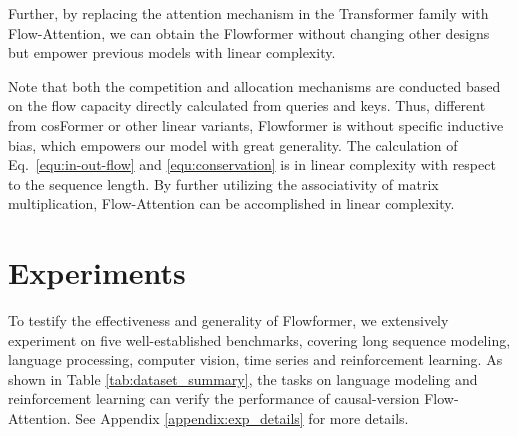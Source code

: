 \documentclass[nohyperref]{article}
\theoremstyle{plain}
\theoremstyle{definition}
\theoremstyle{remark}
\begin{document}
Further, by replacing the attention mechanism in the Transformer family \cite{NIPS2017_3f5ee243} with Flow-Attention, we can obtain the Flowformer without changing other designs but empower previous models with linear complexity.

Note that both the competition and allocation mechanisms are conducted based on the flow capacity directly calculated from queries and keys. Thus, different from cosFormer \cite{anonymous2022cosformer} or other linear variants, Flowformer is without specific inductive bias, which empowers our model with great generality. The calculation of Eq.~\eqref{equ:in-out-flow} and \eqref{equ:conservation} is in linear complexity with respect to the sequence length. By further utilizing the associativity of matrix multiplication, Flow-Attention can be accomplished in linear complexity. 


\vspace{-5pt}
\section{Experiments}

To testify the effectiveness and generality of Flowformer, we extensively experiment on five well-established benchmarks, covering long sequence modeling, language processing, computer vision, time series and reinforcement learning. As shown in Table \ref{tab:dataset_summary}, the tasks on language modeling and reinforcement learning can verify the performance of causal-version Flow-Attention. See Appendix \ref{appendix:exp_details} for more details.

\begin{table}[h]
    \vspace{-10pt}
	\caption{Summary of experiment benchmarks. }
	\label{tab:dataset_summary}
	\vskip 0.1in
	\centering
	\begin{small}
		\begin{sc}
			\renewcommand{\multirowsetup}{\centering}
			\setlength{\tabcolsep}{3.1pt}
		\end{sc}
	\end{small}
	\vspace{-5pt}
\end{table}
\end{document}
